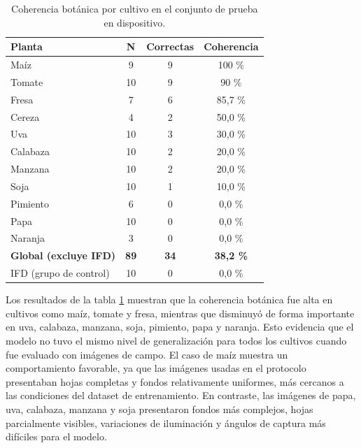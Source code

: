 \begin{table}[H]
    \centering
    \caption{Coherencia botánica por cultivo en el conjunto de prueba en dispositivo.\label{tab:botanical_coherence}}
    \begin{tabular}{|l|c|c|c|}
        \hline
        \textbf{Planta} & \textbf{N} & \textbf{Correctas} & \textbf{Coherencia} \\
        \hline
        Maíz & 9 & 9 & 100 \% \\
        \hline
        Tomate & 10 & 9 & 90 \% \\
        \hline
        Fresa & 7 & 6 & 85,7 \% \\
        \hline
        Cereza & 4 & 2 & 50,0 \% \\
        \hline
        Uva & 10 & 3 & 30,0 \% \\
        \hline
        Calabaza & 10 & 2 & 20,0 \% \\
        \hline
        Manzana & 10 & 2 & 20,0 \% \\
        \hline
        Soja & 10 & 1 & 10,0 \% \\
        \hline
        Pimiento & 6 & 0 & 0,0 \% \\
        \hline
        Papa & 10 & 0 & 0,0 \% \\
        \hline
        Naranja & 3 & 0 & 0,0 \% \\
        \hline
        \textbf{Global (excluye IFD)} & \textbf{89} & \textbf{34} & \textbf{38,2 \%} \\
        \hline
        IFD (grupo de control) & 10 & 0 & 0,0 \% \\
        \hline
    \end{tabular}
\end{table}

Los resultados de la tabla \ref{tab:botanical_coherence} muestran que la coherencia botánica fue alta en cultivos como maíz, tomate y
fresa, mientras que disminuyó de forma importante en uva, calabaza, manzana, soja, pimiento, papa y naranja. Esto evidencia que el modelo
no tuvo el mismo nivel de generalización para todos los cultivos cuando fue evaluado con imágenes de campo. El caso de maíz muestra un
comportamiento favorable, ya que las imágenes usadas en el protocolo presentaban hojas completas y fondos relativamente uniformes, más
cercanos a las condiciones del dataset de entrenamiento. En contraste, las imágenes de papa, uva, calabaza, manzana y soja presentaron
fondos más complejos, hojas parcialmente visibles, variaciones de iluminación y ángulos de captura más difíciles para el modelo.

